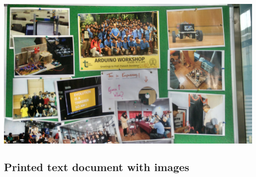 \documentclass{article}
\begin{document}
\includegraphics[scale=0.1]{softboard/original}

\subsection*{Printed text document with images}
\end{document}
